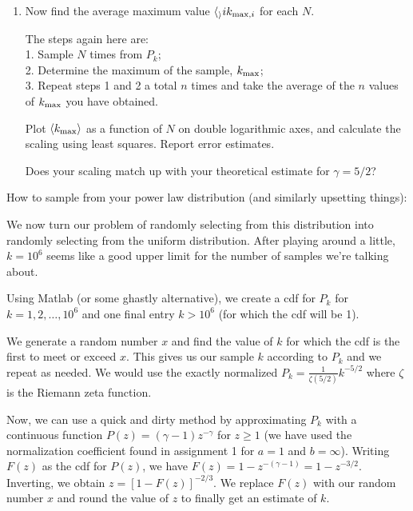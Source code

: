 \begin{enumerate}
\begin{enumerate}
  \item 
    Now find the average
    maximum value
    $\langle_\rangle{i}{k_{\textnormal{max},i}}$
    for each $N$.

    The steps again here are:\\
    1. Sample $N$ times from $P_{k}$;\\
    2. Determine the maximum of the sample, $k_{\textnormal{max}}$;\\
    3. Repeat steps 1 and 2 a total $n$ times and take the average of
    the $n$ values of $k_{\textnormal{max}}$ you have obtained.
    
    Plot $\langle k_{\max}\rangle$ as a function of $N$
    on double logarithmic axes,
    and calculate the scaling using least squares.
    Report error estimates.

    Does your scaling match up with your theoretical
    estimate for $\gamma = 5/2$?

  \end{enumerate}

  How to sample from your power law distribution
  (and similarly upsetting things):

  We now turn our problem of randomly selecting from this distribution
  into randomly selecting from the uniform distribution. 
  After playing around a little, $k=10^6$ seems like a good
  upper limit for the number of samples we're talking about.

  Using Matlab (or some ghastly alternative), we create
  a cdf for $P_k$ for $k=1, 2, \ldots, 10^6$ and one
  final entry $k > 10^6$ (for which the cdf will be 1).

  We generate a random number $x$ and find the value of $k$
  for which the cdf is the first to meet or exceed $x$.
  This gives us our sample $k$ according to $P_k$ and
  we repeat as needed.
  We would use the exactly normalized $P_k = \frac{1}{\zeta(5/2)} k^{-5/2}$ where $\zeta$ is
  the Riemann zeta function.

  Now, we can use a quick and dirty method by approximating $P_k$
  with a continuous function $P(z) = (\gamma-1) z^{-\gamma}$ for $z \ge 1$
  (we have used the normalization coefficient found in assignment 1 for
  $a=1$ and $b=\infty$).  Writing $F(z)$ as the cdf for $P(z)$,
  we have $F(z) = 1-z^{-(\gamma-1)} = 1-z^{-3/2}$.  Inverting,
  we obtain $z = [1-F(z)]^{-2/3}$.  We replace $F(z)$ with our
  random number $x$ and round the value of $z$ to finally get
  an estimate of $k$.

  
   \solutionstart


\end{enumerate}
